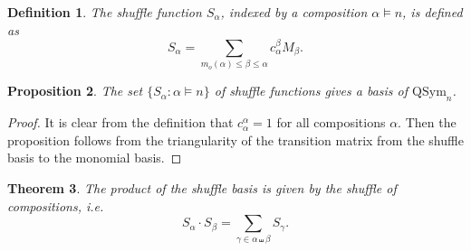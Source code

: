 \documentclass[12pt]{amsart}
\newtheorem{theorem}{Theorem}[section]
\newtheorem{proposition}[theorem]{Proposition}
\newtheorem{definition}[theorem]{Definition}
\numberwithin{equation}{section}
\newcommand{\QSym}{\mathrm{QSym}}
\begin{document}
\begin{definition}
	The shuffle function $S_\alpha$, indexed by a composition $\alpha\models n$, is defined as
	$$S_\alpha=\sum_{m_o(\alpha)\leq\beta\leq\alpha}c_\alpha^\beta M_\beta.$$
\end{definition}

\begin{proposition}
	The set $\{S_\alpha:\alpha\models n\}$ of shuffle functions gives a basis of $\QSym_n$.
\end{proposition}

\begin{proof}
	It is clear from the definition that $c_\alpha^\alpha=1$ for all compositions $\alpha$. Then the proposition follows from the triangularity of the transition matrix from the shuffle basis to the monomial basis.
\end{proof}

\begin{theorem}\label{thm:shuffle-product}
	The product of the shuffle basis is given by the shuffle of compositions, i.e.
	$$S_\alpha\cdot S_\beta=\sum_{\gamma\in\alpha\shuffle\beta}S_\gamma.$$
\end{theorem}
\end{document}
